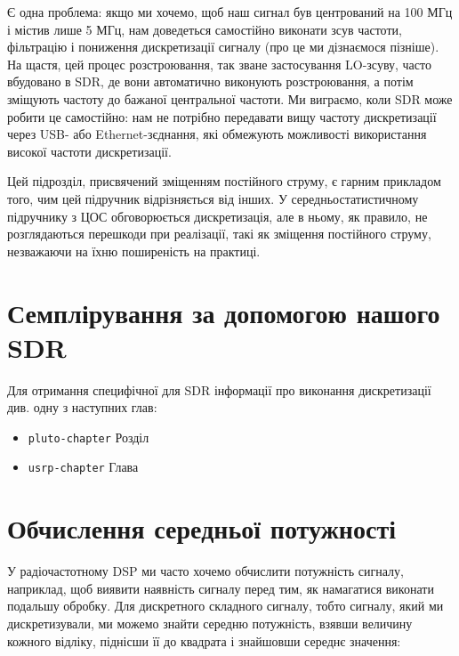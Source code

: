 Є одна проблема: якщо ми хочемо, щоб наш сигнал був центрований на 100
МГц і містив лише 5 МГц, нам доведеться самостійно виконати зсув
частоти, фільтрацію і пониження дискретизації сигналу (про це ми
дізнаємося пізніше). На щастя, цей процес розстроювання, так зване
застосування LO-зсуву, часто вбудовано в SDR, де вони автоматично
виконують розстроювання, а потім зміщують частоту до бажаної центральної
частоти. Ми виграємо, коли SDR може робити це самостійно: нам не
потрібно передавати вищу частоту дискретизації через USB- або
Ethernet-з\textquotesingle єднання, які обмежують можливості
використання високої частоти дискретизації.

Цей підрозділ, присвячений зміщенням постійного струму, є гарним
прикладом того, чим цей підручник відрізняється від інших. У
середньостатистичному підручнику з ЦОС обговорюється дискретизація, але
в ньому, як правило, не розглядаються перешкоди при реалізації, такі як
зміщення постійного струму, незважаючи на їхню поширеність на практиці.

\section{Семплірування за допомогою нашого
SDR}\label{ux441ux435ux43cux43fux43bux456ux440ux443ux432ux430ux43dux43dux44f-ux437ux430-ux434ux43eux43fux43eux43cux43eux433ux43eux44e-ux43dux430ux448ux43eux433ux43e-sdr}

Для отримання специфічної для SDR інформації про виконання дискретизації
див. одну з наступних глав:

\begin{itemize}
\tightlist
\item
  \texttt{pluto-chapter} Розділ
\item
  \texttt{usrp-chapter} Глава
\end{itemize}

\section{Обчислення середньої
потужності}\label{ux43eux431ux447ux438ux441ux43bux435ux43dux43dux44f-ux441ux435ux440ux435ux434ux43dux44cux43eux457-ux43fux43eux442ux443ux436ux43dux43eux441ux442ux456}

У радіочастотному DSP ми часто хочемо обчислити потужність сигналу,
наприклад, щоб виявити наявність сигналу перед тим, як намагатися
виконати подальшу обробку. Для дискретного складного сигналу, тобто
сигналу, який ми дискретизували, ми можемо знайти середню потужність,
взявши величину кожного відліку, піднісши її до квадрата і знайшовши
середнє значення:

